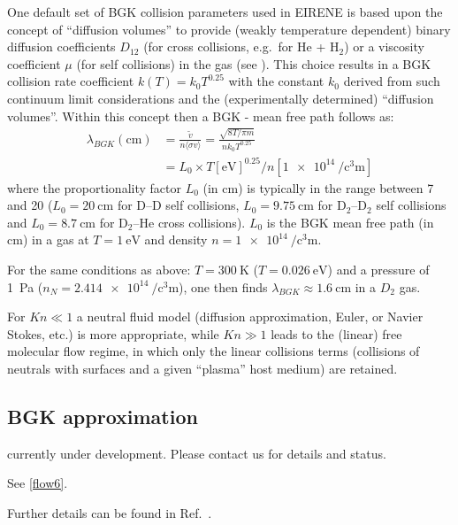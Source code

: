 One default set of \ac{BGK} collision parameters used in EIRENE is based upon
the concept of ``diffusion volumes'' to provide (weakly temperature dependent)
binary diffusion coefficients $D_{12}$ (for cross collisions, e.g.\ for He +
H$_2$) or a viscosity coefficient $\mu$ (for self collisions) in the gas (see
\cite{kn:Reiter94}).
This choice results in a \ac{BGK} collision rate coefficient $k(T)= k_0
  T^{0.25}$  with the constant $k_0$ derived from such continuum limit
considerations and the (experimentally determined) ``diffusion volumes''.
Within this concept then a \ac{BGK} - mean free path \cite{kn:Kotov-Dis}
follows as:
\begin{align}
  \lambda_{BGK}
  (\si{\centi\metre}) & = \frac{\tilde{v}}{n \langle \sigma v\rangle} =
  \frac{\sqrt{8T/\pi m}} {n k_0 T^{0.25}} \nonumber                     \\
                      & = L_0 \times T[\si{\electronvolt}]^{0.25} /
  n[\SI{1e14}{\per\cubic\centi\metre}]
\end{align}
where the proportionality factor $L_0$ (in \si{\centi\metre}) is typically in
the range between 7 and 20 ($L_0 = \SI{20}{\centi\metre}$ for D--D self collisions,
$L_0 = \SI{9.75}{\centi\metre}$ for D$_2$--D$_2$
self collisions and $L_0 = \SI{8.7}{\centi\metre}$ for D$_2$--He cross
collisions).
$L_0$ is the \ac{BGK} mean free path (in \si{\centi\metre}) in a gas at
$T = \SI{1}{\electronvolt}$ and density $n =\SI{1e14}{\per\cubic\centi\metre}$.

For the same conditions as above: $T=\SI{300}{\kelvin}$
($T=\SI{0.026}{\electronvolt}$) and a pressure of \SI{1}{\pascal}
($n_N=\SI{2.414e14}{\per\cubic\centi\metre}$), one then finds
$\lambda_{BGK}\approx \SI{1.6}{\centi\metre}$ in a $D_2$ gas.

For $Kn\ll 1$ a neutral fluid model (diffusion approximation, Euler, or Navier
Stokes, etc.) is more appropriate, while $Kn \gg 1$ leads to the (linear) free
molecular flow regime, in which only the linear collisions terms (collisions of
neutrals with surfaces and a given ``plasma'' host medium) are retained.

\subsection{BGK approximation}\label{sec1-bgk}

currently under development.
Please contact us for details and status.

See \cref{flow6}.

Further details can be found in Ref.\ \cite{kn:Reiter96}.
\bigskip

